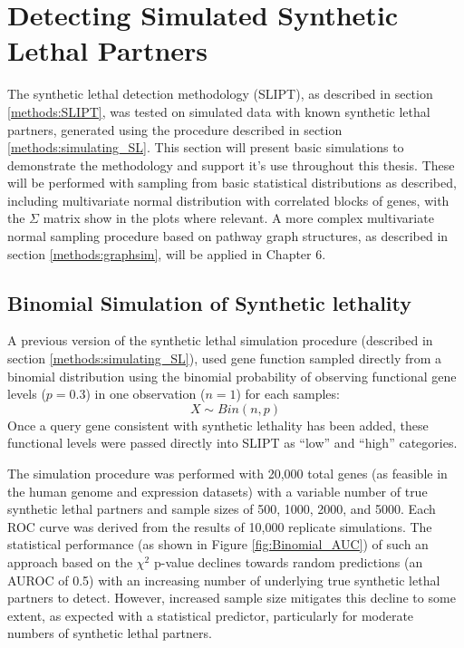 \FloatBarrier

\section{Detecting Simulated Synthetic Lethal Partners} \label{chapt2:simulation_2015}

The synthetic lethal detection methodology (SLIPT), as described in section \ref{methods:SLIPT}, was tested on simulated data with known synthetic lethal partners, generated using the procedure described in section \ref{methods:simulating_SL}. This section will present basic simulations to demonstrate the methodology and support it's use throughout this thesis. These will be performed with sampling from basic statistical distributions as described, including multivariate normal distribution with correlated blocks of genes, with the $\Sigma$ matrix show in the plots where relevant. A more complex multivariate normal sampling procedure based on pathway graph structures, as described in section  \ref{methods:graphsim}, will be applied in Chapter 6. 

\subsection{Binomial Simulation of Synthetic lethality} \label{chapt2:simulation_binom}


A previous version of the synthetic lethal simulation procedure (described in section \ref{methods:simulating_SL}), used gene function sampled directly from a binomial distribution using the binomial probability of observing functional gene levels ($p = 0.3$) in one observation ($n = 1$) for each samples: $$X\sim Bin(n,p)$$  Once a query gene consistent with synthetic lethality has been added, these functional levels were passed directly into SLIPT as ``low'' and ``high'' categories.

The simulation procedure was performed with 20,000 total genes (as feasible in the human genome and expression datasets) with a variable number of true synthetic lethal partners and sample sizes of 500, 1000, 2000, and 5000. Each ROC curve was derived from the results of 10,000 replicate simulations. The statistical performance (as shown in Figure \ref{fig:Binomial_AUC}) of such an approach based on the $\chi^2$ p-value declines towards random predictions (an AUROC of 0.5) with an increasing number of underlying true synthetic lethal partners to detect. However, increased sample size mitigates this decline to some extent, as expected with a statistical predictor, particularly for moderate numbers of synthetic lethal partners. 

